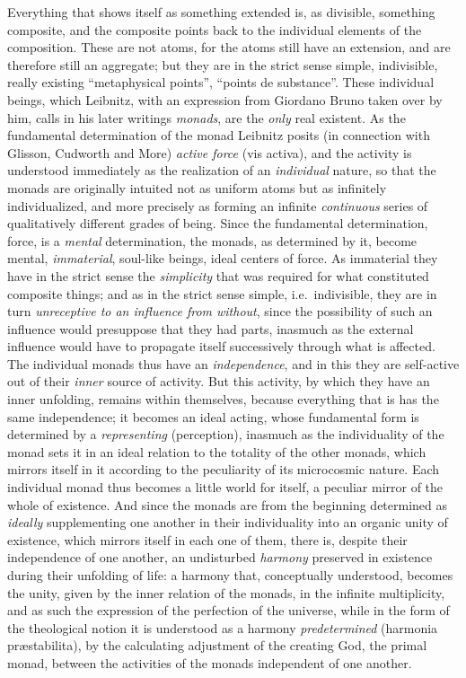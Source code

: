 Everything that shows itself as something extended is, as divisible,
something composite, and the composite points back to the individual
elements of the composition. These are not atoms, for the atoms still
have an extension, and are therefore still an aggregate; but they are
in the strict sense simple, indivisible, really existing ``metaphysical
points'', ``points de substance''. These individual beings, which
Leibnitz, with an expression from Giordano Bruno
taken over by him, calls in his later writings
\emph{monads}, are the \emph{only} real existent. As the fundamental
determination of the monad Leibnitz posits (in connection with Glisson,
Cudworth and More) \emph{active force} (vis activa), and the activity is
understood immediately as the realization of an \emph{individual}
nature, so that the monads are originally intuited not as uniform atoms
but as infinitely individualized, and more precisely as forming an
infinite \emph{continuous} series of qualitatively different grades of
being. Since the fundamental determination, force, is a \emph{mental}
determination, the monads, as determined by it, become mental,
\emph{immaterial}, soul-like beings, ideal centers of force. As
immaterial they have in the strict sense the \emph{simplicity} that was
required for what constituted composite things; and as in the strict
sense simple, i.e.\ indivisible, they are in turn \emph{unreceptive to
an influence from without}, since the possibility of such an influence
would presuppose that they had parts, inasmuch as the external influence
would have to propagate itself successively through what is affected.
The individual monads thus have an \emph{independence}, and in this
they are self-active out of their \emph{inner} source of activity. But
this activity, by which they have an inner unfolding, remains within
themselves, because everything that is has the same independence; it
becomes an ideal acting, whose fundamental form is determined by a
\emph{representing} (perception), inasmuch as the individuality of the
monad sets it in an ideal relation to the totality of the other monads,
which mirrors itself in it according to the peculiarity of its
microcosmic nature. Each individual monad thus becomes a little world
for itself, a peculiar mirror of the whole of existence. And since the
monads are from the beginning determined as \emph{ideally} supplementing
one another in their individuality into an organic unity of existence,
which mirrors itself in each one of them, there is, despite their
independence of one another, an undisturbed \emph{harmony} preserved in
existence during their unfolding of life: a harmony that, conceptually
understood, becomes the unity, given by the inner relation of the
monads, in the infinite
 \setcounter{footnote}{0}
multiplicity, and as such the expression of the perfection of the
universe, while in the form of the theological notion it is understood
as a harmony \emph{predetermined} (harmonia præstabilita), by the
calculating adjustment of the creating God, the primal monad, between
the activities of the monads independent of one another.

